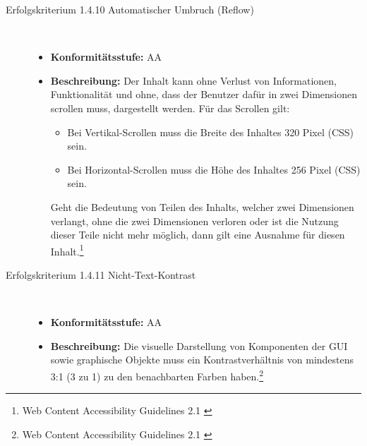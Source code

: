 \begin{description}
\begin{description}
		\item [Erfolgskriterium 1.4.10 Automatischer Umbruch (Reflow)]\hfill \\
		\begin{itemize}
			\item \textbf{Konformitätsstufe:} AA
			\item \textbf{Beschreibung:} Der Inhalt kann ohne Verlust von Informationen, Funktionalität und ohne, dass der Benutzer dafür in zwei Dimensionen 
			scrollen muss, dargestellt werden. Für das Scrollen gilt:
			\begin{itemize}
				\item Bei Vertikal-Scrollen muss die Breite des Inhaltes 320 Pixel (CSS) sein.
				\item Bei Horizontal-Scrollen muss die Höhe des Inhaltes 256 Pixel (CSS) sein. 
			\end{itemize}
			
			Geht die Bedeutung von Teilen des Inhalts, welcher zwei Dimensionen verlangt, ohne die zwei Dimensionen verloren oder ist die Nutzung dieser Teile nicht mehr möglich, dann 
			gilt eine Ausnahme für diesen Inhalt.\footnote{Web Content Accessibility Guidelines 2.1 \cite{WCAG2.1}}
		\end{itemize}
		
		\item [Erfolgskriterium 1.4.11 Nicht-Text-Kontrast]\hfill \\
		\begin{itemize}
			\item \textbf{Konformitätsstufe:} AA
			\item \textbf{Beschreibung:} Die visuelle Darstellung von Komponenten der \ac{GUI} sowie graphische Objekte muss ein Kontrastverhältnis von mindestens 3:1 (3 zu 1) zu den 
			benachbarten Farben haben.\footnote{Web Content Accessibility Guidelines 2.1 \cite{WCAG2.1}}
		\end{itemize}
		

\end{description}
\end{description}
